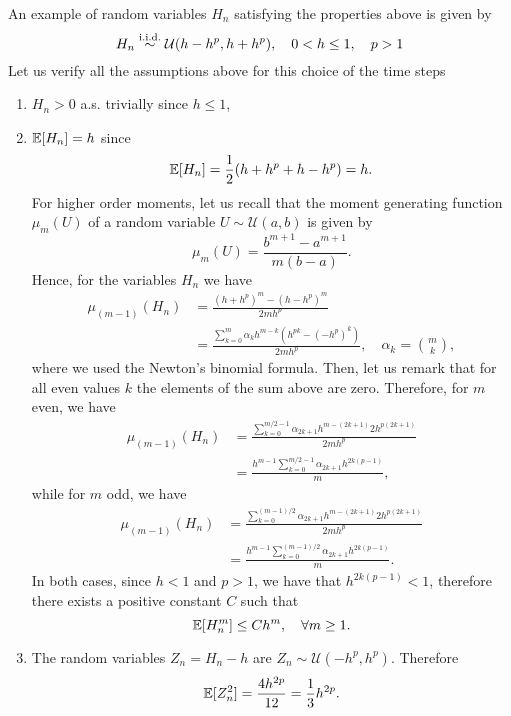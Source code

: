 \documentclass{scrartcl}
\begin{document}
\begin{example}\label{ex:uniformH} An example of random variables $H_n$ satisfying the properties above is given by
	\begin{equation}
		H_n \stackrel{\text{i.i.d.}}{\sim} \mathcal{U}(h-h^p, h+h^p), \quad 0 < h \leq 1, \quad p > 1
	\end{equation}
	Let us verify all the assumptions above for this choice of the time steps
	\begin{enumerate}
		\item $H_n > 0$ a.s. trivially since $h \leq 1$,
		\item $\mathbb{E}[H_n] = h$ since 
		\begin{equation}
			\mathbb{E}[H_n] = \frac{1}{2}(h + h^p + h - h^p) = h.
		\end{equation}
		For higher order moments, let us recall that the moment generating function $\mu_{m}(U)$ of a random variable $U \sim \mathcal{U}(a,b)$ is given by
		\begin{equation}
			\mu_m(U) =  \frac{b^{m+1} - a^{m+1}}{m(b-a)}.
		\end{equation}
		Hence, for the variables $H_n$ we have
		\begin{equation}
		\begin{aligned}
			\mu_{(m-1)}(H_n) &= \frac{(h + h^p)^{m} - (h - h^p)^{m}}{2mh^p}\\
			&= \frac{\sum_{k=0}^m \alpha_k h^{m-k}(h^{pk} - (-h^p)^k)}{2mh^p}, \quad \alpha_k = \binom{m}{k},
		\end{aligned}
		\end{equation}
		where we used the Newton's binomial formula. Then, let us remark that for all even values $k$ the elements of the sum above are zero. Therefore, for $m$ even, we have
		\begin{equation}
		\begin{aligned}
			\mu_{(m-1)}(H_n) &= \frac{\sum_{k=0}^{m/2 - 1} \alpha_{2k + 1} h^{m-(2k+1)}2h^{p(2k+1)}}{2mh^p}\\
			&= \frac{h^{m-1}\sum_{k=0}^{m/2 - 1} \alpha_{2k + 1} h^{2k(p-1)}}{m},
		\end{aligned}
		\end{equation}
		while for $m$ odd, we have
		\begin{equation}
		\begin{aligned}
			\mu_{(m-1)}(H_n) &= \frac{\sum_{k=0}^{(m-1)/2} \alpha_{2k + 1} h^{m-(2k+1)}2h^{p(2k+1)}}{2mh^p}\\
			&= \frac{h^{m-1}\sum_{k=0}^{(m-1)/2} \alpha_{2k + 1} h^{2k(p-1)}}{m}.
		\end{aligned}
		\end{equation}
		In both cases, since $h < 1$ and $p > 1$, we have that $h^{2k(p-1)} < 1$, therefore there exists a positive constant $C$ such that
		\begin{equation}
			\mathbb{E}[H_n^m] \leq Ch^m, \quad \forall m \geq 1.
		\end{equation}
		\item The random variables $Z_n = H_n - h$ are $Z_n \sim \mathcal{U}(-h^p, h^p)$. Therefore
		\begin{equation}
			\mathbb{E}[Z_n^2] = \frac{4h^{2p}}{12} = \frac{1}{3}h^{2p}.
		\end{equation}
	\end{enumerate}
\end{example}
\end{document}
